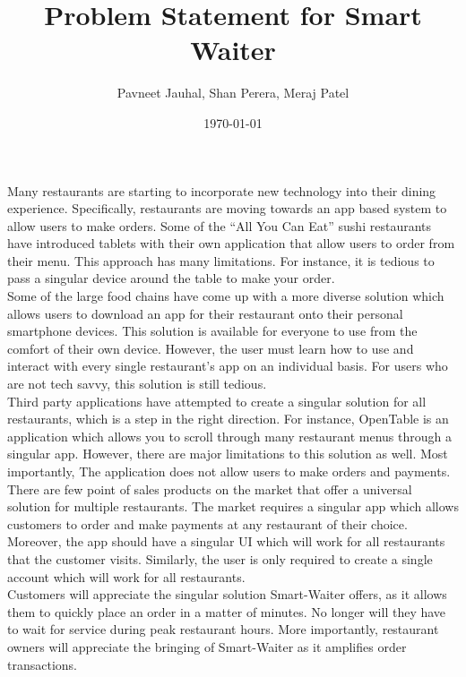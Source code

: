 \documentclass[12pt]{article}
\begin{document}
\title{Problem Statement for Smart Waiter} 
\author{Pavneet Jauhal, Shan Perera, Meraj Patel}
\date{\today}

\maketitle

	Many restaurants are starting to incorporate new technology into their dining experience. Specifically, restaurants are moving towards an app based system to allow users to make orders. Some of the ``All You Can Eat'' sushi restaurants have introduced tablets with their own application that allow users to order from their menu. This approach has many limitations. For instance, it is tedious to pass a singular device around the table to make your order. \\
	
	Some of the large food chains have come up with a more diverse solution which allows users to download an app for their restaurant onto their personal smartphone devices. This solution is available for everyone to use from the comfort of their own device. However, the user must learn how to use and interact with every single restaurant's app on an individual basis.  For users who are not tech savvy, this solution is still tedious.\\
	
	Third party applications have attempted to create a singular solution for all restaurants, which is a step in the right direction. For instance, OpenTable is an application which allows you to scroll through many restaurant menus through a singular app. However, there are major limitations to this solution as well. Most importantly, The application does not allow users to make orders and payments.\\

	There are few point of sales products on the market that offer a universal solution for multiple restaurants. The market requires a singular app which allows customers to order and make payments at any restaurant of their choice. Moreover, the app should have a singular UI which will work for all restaurants that the customer visits. Similarly, the user is only required to create a single account which will work for all restaurants.\\
	
	Customers will appreciate the singular solution Smart-Waiter offers, as it allows them to quickly place an order in a matter of minutes. No longer will they have to wait for service during peak restaurant hours. More importantly, restaurant owners will appreciate the bringing of Smart-Waiter as it amplifies order transactions. 
\end{document}
